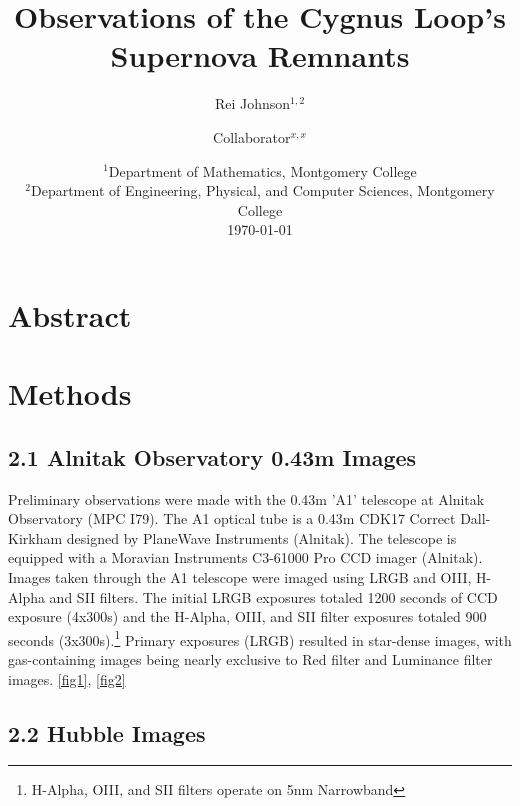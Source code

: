 \documentclass[12pt, a4paper]{article}
\title{Observations of the Cygnus Loop’s Supernova Remnants}
\author{Rei Johnson$^{1, 2}$ \and Collaborator$^{x,x}$}
\date{%
	$^1$Department of Mathematics, Montgomery College\\%
	$^2$Department of Engineering, Physical, and Computer Sciences, Montgomery College\\[2ex]%
	\today
}
\begin{document}
\maketitle
\newpage

\centering
\section[bold]{Abstract}

\raggedright

\lipsum[1]

\centering
\section[bold]{Methods}

\begin{multicols*}{2}

\raggedright

\subsection[bold]{2.1 Alnitak Observatory 0.43m Images}
Preliminary observations were made with the 0.43m 'A1' telescope at Alnitak Observatory (MPC I79). The A1 optical tube is a 0.43m CDK17 Correct Dall-Kirkham designed by PlaneWave Instruments (Alnitak). The telescope is equipped with a Moravian Instruments C3-61000 Pro CCD imager (Alnitak). Images taken through the A1 telescope were imaged using LRGB and OIII, H-Alpha and SII filters. The initial LRGB exposures totaled 1200 seconds of CCD exposure (4x300s) and the H-Alpha, OIII, and SII filter exposures totaled 900 seconds (3x300s).\footnote{H-Alpha, OIII, and SII filters operate on 5nm Narrowband} Primary exposures (LRGB) resulted in star-dense images, with gas-containing images being nearly exclusive to Red filter and Luminance filter images. \ref{fig1}, \ref{fig2}

\subsection[bold]{2.2 Hubble Images}
\end{multicols*}



\end{document}
